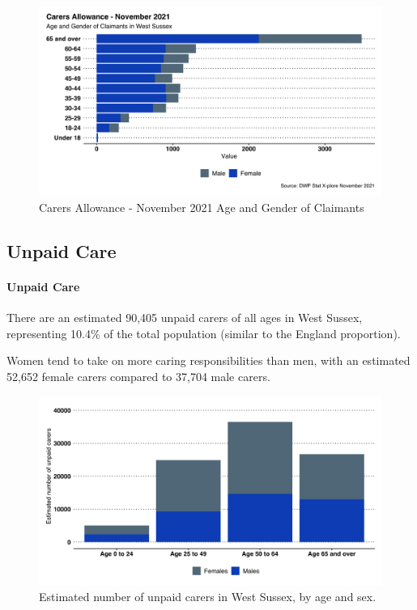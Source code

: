 \begin{figure}[h]
    \caption{Carers Allowance - November 2021 Age and Gender of Claimants}\label{fig:carer-claims-age-gender}
    \centering
    \includegraphics[width=\linewidth]{images/carers_allowance_recipients.png}
\end{figure}


\subsection{Unpaid Care}
\paragraph{Unpaid Care}There are an estimated 90,405 unpaid carers of all ages in West Sussex, representing 10.4\% of the total population (similar to the England proportion).

Women tend to take on more caring responsibilities than men, with an estimated 52,652 female carers compared to 37,704 male carers.

\begin{figure}[h]
    \caption{Estimated number of unpaid carers in West Sussex, by age and sex.}\label{fig:unpaid-carers-sex-age}
    \centering
    \includegraphics[width=\linewidth]{images/wsx_unpaid_carers_by_age.png}
\end{figure}

